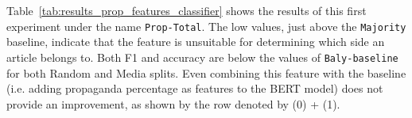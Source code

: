 


Table~\ref{tab:results_prop_features_classifier} shows the results of this first experiment under the name \texttt{Prop-Total}. The low values, just above the \texttt{Majority} baseline, indicate that the feature is unsuitable for determining which side an article belongs to. Both F1 and accuracy are below the values of \texttt{Baly-baseline} for both Random and Media splits. Even combining this feature with the baseline (i.e. adding propaganda percentage as features to the BERT model) does not provide an improvement, as shown by the row denoted by (0) + (1).




